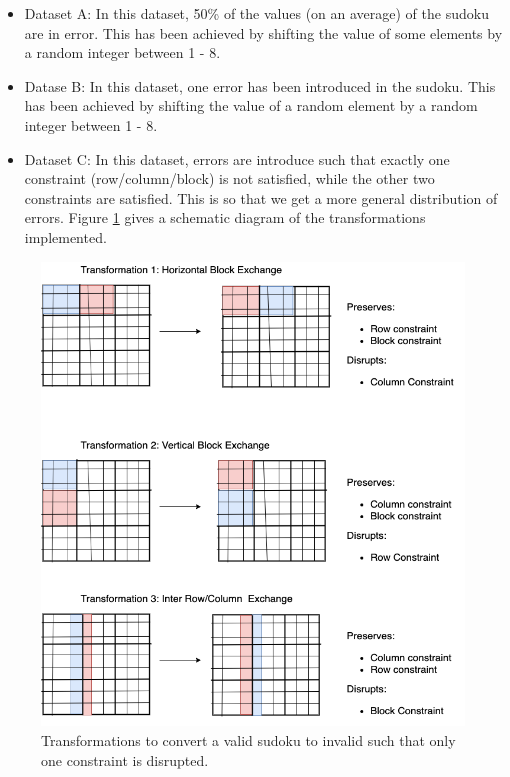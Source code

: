 \documentclass[twoside]{article}
\begin{document}
\begin{itemize}
	\item Dataset A: In this dataset, 50\% of the values (on an average) of the sudoku are in error. This has been achieved by shifting the value of some elements by a random integer between 1 - 8.
	\item Datase B: In this dataset, one error has been introduced in the sudoku. This has been achieved by shifting the value of a random element by a random integer between 1 - 8.
	\item Dataset C: In this dataset, errors are introduce such that exactly one constraint (row/column/block) is not satisfied, while the other two constraints are satisfied. This is so that we get a more general distribution of errors. Figure \ref{fig:transformations} gives a schematic diagram of the transformations implemented.
\end{itemize}

\begin{figure}
  \centering
  \includegraphics[width=\textwidth]{transformations.png}
  \caption{Transformations to convert a valid sudoku to invalid such that only one constraint is disrupted.}
  \label{fig:transformations}
\end{figure}
\end{document}
